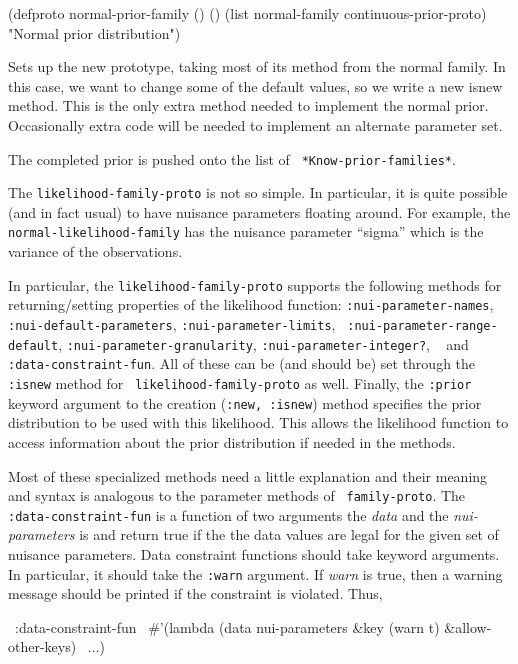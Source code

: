 \begincode
(defproto normal-prior-family () () (list normal-family continuous-prior-proto)
  "Normal prior distribution")
\endcode

Sets up the new prototype, taking most of its method from the normal
family.  In this case, we want to change some of the default values,
so we write a new \:isnew method.  This is the only extra method
needed to implement the normal prior.  Occasionally extra code will be
needed to implement an alternate parameter set.

The completed prior is pushed onto the list of {\tt
*Know-prior-families*\/}. 

\medskip

The {\tt likelihood-family-proto\/} is not so simple.  In particular, it
is quite possible (and in fact usual) to have nuisance parameters
floating around.  For example, the {\tt normal-likelihood-family\/}
has the nuisance parameter ``sigma'' which is the variance of the
observations.  

In particular, the {\tt likelihood-family-proto\/} supports the
following methods for returning/setting properties of the likelihood
function:  {\tt :nui-parameter-names\/}, {\tt
:nui-default-parameters\/}, {\tt :nui-parameter-limits\/}, {\tt
:nui-parameter-range-default\/}, {\tt :nui-parameter-granularity\/},
{\tt :nui-parameter-integer?\/},  \ 
and {\tt :data-constraint-fun\/}.  All of these can be (and should be)
set through the {\tt :isnew\/} method for {\tt
likelihood-family-proto\/} as well.   Finally, the {\tt :prior\/}
keyword argument to the creation ({\tt :new, :isnew\/}) method
specifies the prior distribution to be used with this likelihood.
This allows the likelihood function to access information about the
prior distribution if needed in the methods.

Most of these specialized methods need a little explanation and their
meaning and syntax is analogous to the parameter methods of {\tt
family-proto\/}.   The {\tt :data-constraint-fun\/} is a function of
two arguments the {\it data\/} and the {\it nui-parameters\/} is
and return true if the the data values are legal for the given set of
nuisance parameters.  Data constraint functions should take
keyword arguments.  In particular, it should take the {\tt :warn\/}
argument.  If {\it warn\/} is true, then a warning message should be
printed if the constraint is violated.  Thus, 

\begincode
\  :data-constraint-fun 
\   \#'(lambda (data nui-parameters \&key (warn t) \&allow-other-keys)
\       $\ldots$)
\endcode

